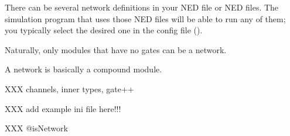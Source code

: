 There can be several network definitions in your NED file or NED files.
The simulation program that uses those NED files will be
able to run any of them; you typically select the desired one
in the config file ().

Naturally, only modules that have no gates can be a network.

A network is basically a compound module.

XXX channels, inner types, gate++

XXX add example ini file here!!!

XXX @isNetwork





